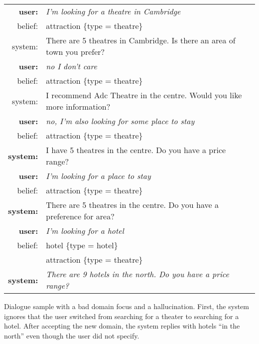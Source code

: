 \documentclass[11pt]{article}
\begin{document}
\begin{example}[tpbh]
\small
\setlength{\tabcolsep}{2pt}
\begin{mdframed}[style=ExampleFrame]
\begin{tabularx}{\textwidth}{rX}
\bf user: & \it I'm looking for a theatre in Cambridge \\
belief: & attraction \{type = theatre\} \\
system: & There are 5 theatres in Cambridge. Is there an area of town you prefer? \\
\bf user: & \it no I don't care \\
belief: & attraction \{type = theatre\} \\
system: & I recommend Adc Theatre in the centre. Would you like more information? \\
\bf user: & \it no, I'm also looking for some place to stay \\
belief: & attraction \{type = theatre\} \\
\bf system: & I have 5 theatres in the centre. Do you have a price range? \\
\bf user: &  \it I'm looking for a place to stay \\
belief: & attraction \{type = theatre\} \\
\bf system: & There are 5 theatres in the centre. Do you have a preference for area? \\
\bf user: & \it I'm looking for a hotel \\
belief: & hotel \{type = hotel\} \\ 
& attraction \{type = theatre\} \\
\bf system: & \it There are 9 hotels in the north. Do you have a price range?\\
\end{tabularx}
\end{mdframed}
\caption{Dialogue sample with a bad domain focus and a hallucination. First, the system ignores that the user switched from searching for a theater to searching for a hotel. After accepting the new domain, the system replies with hotels “in the north” even though the user did not specify.\label{ex:error2}}
\end{example}
\end{document}
